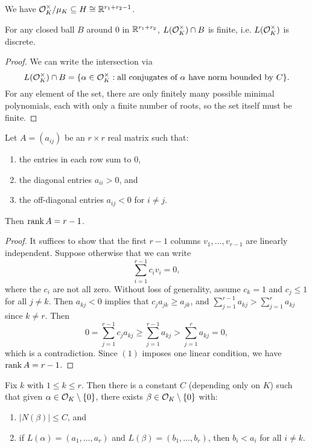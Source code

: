 \begin{corollary}
  We have $\mathcal{O}_K^\times / \mu_K \subseteq H \cong \mathbb{R}^{r_1 + r_2 - 1}$.
\end{corollary}

\begin{lemma}\label{lem:intersection-discrete}
  For any closed ball $B$ around $0$
  in $\mathbb{R}^{r_1 + r_2}$,
  $L(\mathcal{O}_K^\times) \cap B$ is finite,
  i.e. $L(\mathcal{O}_K^\times)$ is discrete.
\end{lemma}

\begin{proof}
  We can write the intersection via
  \[
    L(\mathcal{O}_K^\times) \cap B = \{\alpha \in \mathcal{O}_K^\times : \text{all conjugates of $\alpha$ have norm bounded by $C$}\}.
  \]
  For any element of the set, there are only finitely
  many possible minimal polynomials, each with only a
  finite number of roots, so the set itself must be
  finite.
\end{proof}

\begin{lemma}\label{lem:lin-alg}
  Let $A = (a_{ij})$ be an $r \times r$ real matrix
  such that:
  \begin{enumerate}
    \item the entries in each row sum to $0$,
    \item the diagonal entries $a_{ii} > 0$, and
    \item the off-diagonal entries $a_{ij} < 0$
      for $i \ne j$.
  \end{enumerate}
  Then $\operatorname{rank} A = r - 1$.
\end{lemma}

\begin{proof}
  It suffices to show that the first $r - 1$ columns
  $v_1, \dots, v_{r - 1}$ are linearly independent.
  Suppose otherwise that we can write
  \[
    \sum_{i = 1}^{r - 1} c_i v_i = 0,
  \]
  where the $c_i$ are not all zero.
  Without loss of generality, assume $c_k = 1$ and
  $c_j \le 1$ for all $j \ne k$. Then
  $a_{kj} < 0$ implies that $c_j a_{jk} \ge a_{jk}$, and
  $\sum_{j = 1}^{r - 1} a_{kj} > \sum_{j = 1}^r a_{kj}$
  since $k \ne r$. Then
  \[
    0 = \sum_{j = 1}^{r - 1} c_j a_{kj}
    \ge \sum_{j = 1}^{r - 1} a_{kj}
    > \sum_{j = 1}^r a_{kj} = 0,
  \]
  which is a contradiction. Since
  $(1)$ imposes one linear condition, we have
  $\operatorname{rank} A = r - 1$.
\end{proof}

\begin{lemma}\label{lem:smaller}
  Fix $k$ with $1 \le k \le r$. Then there is a
  constant $C$ (depending only on $K$) such that
  given $\alpha \in \mathcal{O}_K \setminus \{0\}$, there
  exists $\beta \in \mathcal{O}_K \setminus \{0\}$ with:
  \begin{enumerate}
    \item $|N(\beta)| \le C$, and
    \item if $L(\alpha) = (a_1, \dots, a_r)$ and
      $L(\beta) = (b_1, \dots, b_r)$, then
      $b_i < a_i$ for all $i \ne k$.
  \end{enumerate}
\end{lemma}

